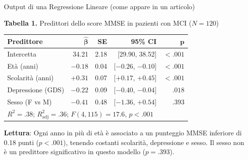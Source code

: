 \documentclass[
  ignorenonframetext,
]{beamer}
\begin{document}
\begin{frame}{Output di una Regressione Lineare (come appare in un
articolo)}
\label{output-di-una-regressione-lineare-come-appare-in-un-articolo}
\vspace{-0.2em}
\begin{center}
\small
\textbf{Tabella 1.} Predittori dello score MMSE in pazienti con MCI ($N = 120$)
\vspace{0.4em}

\begin{tabular}{lrrrr}
\toprule
\textbf{Predittore} & $\boldsymbol{\hat{\beta}}$ & \textbf{SE} & \textbf{95\% CI} & $\boldsymbol{p}$ \\
\midrule
Intercetta           & 34.21 & 2.18 & [29.90, 38.52] & $<.001$ \\
\rowcolor{mblue!8}
Età (anni)           & $-0.18$ & 0.04 & [$-0.26$, $-0.10$] & $<.001$ \\
Scolarità (anni)     & $+0.31$ & 0.07 & [$+0.17$, $+0.45$] & $<.001$ \\
\rowcolor{mblue!8}
Depressione (GDS)    & $-0.22$ & 0.09 & [$-0.40$, $-0.04$] & $.018$  \\
Sesso (F vs M)       & $-0.41$ & 0.48 & [$-1.36$, $+0.54$] & $.393$  \\
\midrule
\multicolumn{5}{l}{\footnotesize $R^2 = .38$; \; $R^2_{\text{adj}} = .36$; \; $F(4, 115) = 17.6$, $p < .001$} \\
\bottomrule
\end{tabular}
\end{center}
\vspace{0.2em}
\footnotesize
\textbf{Lettura}: Ogni anno in più di età è associato a un punteggio MMSE inferiore di 0.18 punti ($p < .001$), tenendo costanti scolarità, depressione e sesso. Il sesso non è un predittore significativo in questo modello ($p = .393$).
\end{frame}
\end{document}
